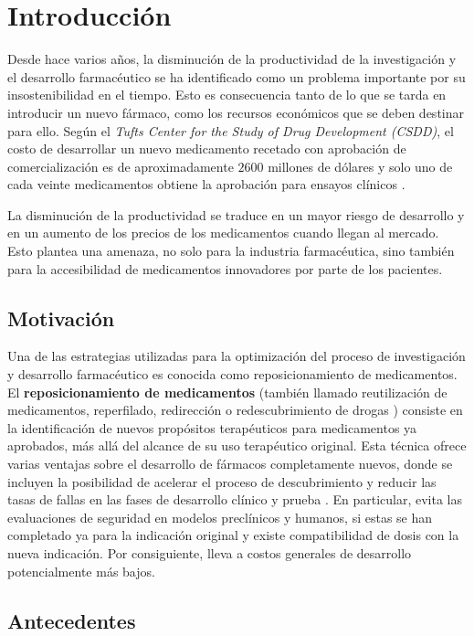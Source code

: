 \chapter*{Introducción}\label{chapter:introduction}

Desde hace varios años, la disminución de la productividad de la investigación y el desarrollo farmacéutico se ha identificado como un problema importante por su insostenibilidad en el tiempo. Esto es consecuencia tanto de lo que se tarda en introducir un nuevo fármaco, como los recursos económicos que se deben destinar para ello. Según el \textit{Tufts Center for the Study of Drug Development (CSDD)}, el costo de desarrollar un nuevo medicamento recetado con aprobación de comercialización es de aproximadamente $2600$ millones de dólares y solo uno de cada veinte medicamentos obtiene la aprobación para ensayos clínicos \cite{alcim}. 

La disminución de la productividad se traduce en un mayor riesgo de desarrollo y en un aumento de los precios de los medicamentos cuando llegan al mercado. Esto plantea una amenaza, no solo para la industria farmacéutica, sino también para la accesibilidad de medicamentos innovadores por parte de los pacientes.

\section*{Motivación}
Una de las estrategias utilizadas para la optimización del proceso de investigación y desarrollo farmacéutico es conocida como reposicionamiento de medicamentos.
El \textbf{reposicionamiento de medicamentos} (también llamado reutilización de medicamentos, reperfilado, redirección o redescubrimiento de drogas \cite{repurposingconcept}) consiste en la identificación de nuevos propósitos terapéuticos para medicamentos ya aprobados, más allá del alcance de su uso terapéutico original. Esta técnica ofrece varias ventajas sobre el desarrollo de fármacos completamente nuevos, donde se incluyen la posibilidad de acelerar el proceso de descubrimiento y reducir las tasas de fallas en las fases de desarrollo clínico y prueba \cite{advantages}. En particular, evita las evaluaciones de seguridad en modelos preclínicos y humanos, si estas se han completado ya para la indicación original y existe compatibilidad de dosis con la nueva indicación. Por consiguiente, lleva a costos generales de desarrollo potencialmente más bajos.

\section*{Antecedentes}

